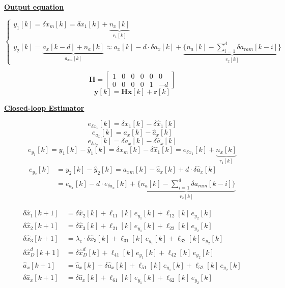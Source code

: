 \documentclass[11pt,a4paper]{ctexart}
\newcommand{\lc}{\lambda_c}
\newcommand{\hd}[1]{\par\medskip\noindent\underline{\textbf{#1}}\par\nobreak\vspace{0.2ex}}
\begin{document}
\hd{Output equation}
\[
\begin{cases}
y_1[k] = \delta x_m[k] = \delta x_1[k] + \underbrace{n_x[k]}_{r_1[k]} \\[2.0ex]
y_2[k] = \underbrace{a_x[k-d] + n_a[k]}_{a_{xm}[k]} \approx a_x[k] - d\cdot \delta a_x[k] + \underbrace{\Big\{ n_a[k] - \textstyle\sum_{i=1}^{d}\delta a_{ram}[k-i] \Big\}}_{r_2[k]}
\end{cases}
\]

\[ \mathbf{H} = \begin{bmatrix} 1 & 0 & 0 & 0 & 0 & 0 \\ 0 & 0 & 0 & 0 & 1 & -d \end{bmatrix} \]
\[ \mathbf{y}[k] = \mathbf{H}\mathbf{x}[k] + \mathbf{r}[k] \]

\newpage
\hd{Closed-loop Estimator}
\[ e_{\delta x_1}[k] = \delta x_1[k] - \delta \hat x_1[k] \]
\[ e_{a_x}[k] = a_x[k] - \hat a_x[k] \]
\[ e_{\delta a_x}[k] = \delta a_x[k] - \delta \hat a_x[k] \]
\[ e_{y_1}[k] = y_1[k] - \hat y_1[k] = \delta x_m[k] - \delta \hat x_1[k] = e_{\delta x_1}[k] + \underbrace{n_x[k]}_{r_1[k]} \]
\[
\begin{aligned}
e_{y_2}[k] &= y_2[k] - \hat y_2[k] = a_{xm}[k] - \hat a_x[k] + d\cdot \delta \hat a_x[k] \\
&= e_{a_x}[k] - d\cdot e_{\delta a_x}[k] + \underbrace{\Big\{ n_a[k] - \textstyle\sum_{i=1}^{d}\delta a_{ram}[k-i] \Big\}}_{r_2[k]}
\end{aligned}
\]

\medskip
\[
\begin{aligned}
\delta \hat x_1[k+1] &= \delta \hat x_2[k] + \ell_{11}[k]\, e_{y_1}[k] + \ell_{12}[k]\, e_{y_2}[k] \\
\delta \hat x_2[k+1] &= \delta \hat x_3[k] + \ell_{21}[k]\, e_{y_1}[k] + \ell_{22}[k]\, e_{y_2}[k] \\
\delta \hat x_3[k+1] &= \lc \cdot \delta \hat x_3[k] + \ell_{31}[k]\, e_{y_1}[k] + \ell_{32}[k]\, e_{y_2}[k] \\
\delta \hat x_D^{d}[k+1] &= \delta \hat x_D^{d}[k] + \ell_{41}[k]\, e_{y_1}[k] + \ell_{42}[k]\, e_{y_2}[k] \\
\hat a_x[k+1] &= \hat a_x[k] + \delta \hat a_x[k] + \ell_{51}[k]\, e_{y_1}[k] + \ell_{52}[k]\, e_{y_2}[k] \\
\delta \hat a_x[k+1] &= \delta \hat a_x[k] + \ell_{61}[k]\, e_{y_1}[k] + \ell_{62}[k]\, e_{y_2}[k]
\end{aligned}
\]
\end{document}
